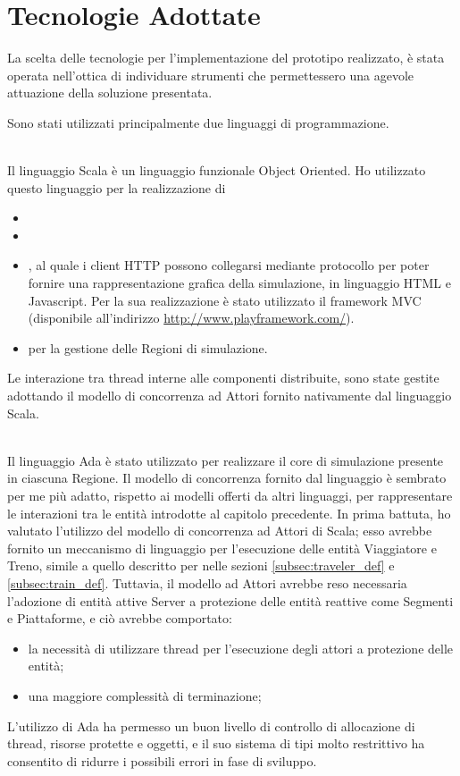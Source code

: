 \chapter{Tecnologie Adottate}

La scelta delle tecnologie per l'implementazione del prototipo realizzato, è stata operata nell'ottica di individuare strumenti che permettessero una agevole attuazione della soluzione presentata.

Sono stati utilizzati principalmente due linguaggi di programmazione.
	\begin{description}
		\item {} \\
		Il linguaggio Scala è un linguaggio funzionale Object Oriented. Ho utilizzato questo linguaggio per la realizzazione di 
			\begin{itemize}
				\item {}
				\item {}
				\item {}, al quale i client HTTP possono collegarsi mediante protocollo  per poter fornire una rappresentazione grafica della simulazione, in linguaggio HTML e Javascript. Per la sua realizzazione è stato utilizzato il framework MVC  (disponibile all'indirizzo \url{http://www.playframework.com/}).
				\item {} per la gestione delle Regioni di simulazione.
			\end{itemize}
		Le interazione tra thread interne alle componenti distribuite, sono state gestite adottando il modello di concorrenza ad Attori fornito nativamente dal linguaggio Scala. 
		\item {} \\
		Il linguaggio Ada è stato utilizzato per realizzare il core di simulazione presente in ciascuna Regione. Il modello di concorrenza fornito dal linguaggio è sembrato per me più adatto, rispetto ai modelli offerti da altri linguaggi, per rappresentare le interazioni tra le entità introdotte al capitolo precedente. 
		In prima battuta, ho valutato l'utilizzo del modello di concorrenza ad Attori di Scala; esso avrebbe fornito un meccanismo di linguaggio per l'esecuzione delle entità Viaggiatore e Treno, simile a quello descritto per nelle sezioni \ref{subsec:traveler_def} e \ref{subsec:train_def}. Tuttavia, il modello ad Attori avrebbe reso necessaria l'adozione di entità attive Server a protezione delle entità reattive come Segmenti e Piattaforme, e ciò avrebbe comportato:
			\begin{itemize}
				\item la necessità di utilizzare thread per l'esecuzione degli attori a protezione delle entità;
				\item una maggiore complessità di terminazione;
			\end{itemize}
		L'utilizzo di Ada ha permesso un buon livello di controllo di allocazione di thread, risorse protette e oggetti, e il suo sistema di tipi molto restrittivo ha consentito di ridurre i possibili errori in fase di sviluppo.
		  
	\end{description}
	
